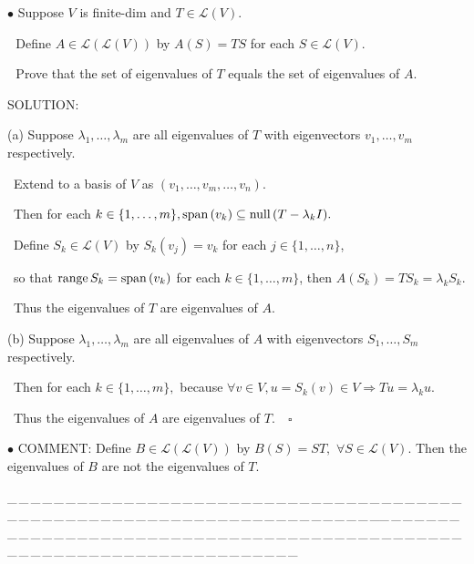 \documentclass[a4paper, 11pt, UTF8]{article}
\def\range{\textup{range}\,}
\def\null{\textup{null\,}}
\def\Spn{\textup{span}\,}
\def\Lm{\mathcal{L}}
\begin{document}
\begin{large}
{\small $\bullet$} {\timessl\Large 
Suppose $V$ is finite-dim and $T\in\Lm(V)$.}\par\,\,
{\timessl\Large Define $A\in\Lm(\Lm(V))$ by $A(S) = TS$ for each $S\in\Lm(V)$.}\par\,\,
{\timessl\Large Prove that the set of eigenvalues of $T$ equals the set of
eigenvalues of $A$.
}\par
{\timesbf S\footnotesize{OLUTION:}}\par\quad
(a) Suppose $\lambda_1,\dots,\lambda_m$ are all eigenvalues of $T$ with eigenvectors $v_1,\dots,v_m$ respectively.\par\qquad\,
Extend to a basis of $V$ as $(v_1,\dots,v_m,\dots,v_n).$\par\qquad\,
Then for each $k\in\{1,\dots,m\},\Spn(v_k)\subseteq\null(T-\lambda_k I).$\par\qquad\,
Define $S_k\in\Lm(V)$ by $S_k(v_j)=v_k$ for each $j\in\{1,\dots,n\}$,\par\qquad\qquad\quad\,
so that $\range S_k=\Spn(v_k)$ for each $k\in\{1,\dots,m\}$, then $A(S_k)=TS_k=\lambda_k S_k.$\par\qquad\,
Thus the eigenvalues of $T$ are eigenvalues of $A.$\par\quad
(b) Suppose $\lambda_1,\dots,\lambda_m$ are all eigenvalues of $A$ with eigenvectors $S_1,\dots,S_m$ respectively.\par\qquad\,
Then for each $k\in\{1,\dots,m\},$ because $\forall v\in V,u=S_k(v)\in V\Rightarrow Tu=\lambda_k u.$\par\qquad\,
Thus the eigenvalues of $A$ are eigenvalues of $T.\quad\square$\par
{\small $\bullet$} C{\small OMMENT:} {\normalsize Define $B\in\Lm(\Lm(V))$ by $B(S)=ST,$ $\forall S\in\Lm(V).$
Then the eigenvalues of $B$ are not the eigenvalues of $T.$}\par
{\tiny \_\,\_\,\_\,\_\,\_\,\_\,\_\,\_\,\_\,\_\,\_\,\_\,\_\,\_\,\_\,\_\,\_\,\_\,\_\,\_\,\_\,\_\,\_\,\_\,\_\,\_\,\_\,\_\,\_\,\_\,\_\,\_\,\_\,\_\,\_\,\_\,\_\,\_\,\_\,\_\,\_\,\_\,\_\,\_\,\_\,\_\,\_\,\_\,\_\,\_\,\_\,\_\,\_\,\_\,\_\,\_\,\_\,\_\,\_\,\_\,\_\,\_\,\_\,\_\,\_\,\_\,\_\,\_\,\_\,\_\,\_\_\,\_\,\_\,\_\,\_\,\_\,\_\,\_\,\_\,\_\,\_\,\_\,\_\,\_\,\_\,\_\,\_\,\_\,\_\,\_\,\_\,\_\,\_\,\_\,\_\,\_\,\_\,\_\,\_\,\_\,\_\,\_\,\_\,\_\,\_\,\_\,\_\,\_\,\_\,\_\,\_\,\_\,\_\,\_\,\_\,\_\,\_\,\_\,\_\,\_\,\_\,\_\,\_\,\_\,\_\,\_\,\_\,\_\,\_\,\_\,\_\,\_\,\_\,\_\,\_\,\_\,\_\,\_\,\_\,\_\,\_}\par


\end{large}
\end{document}
